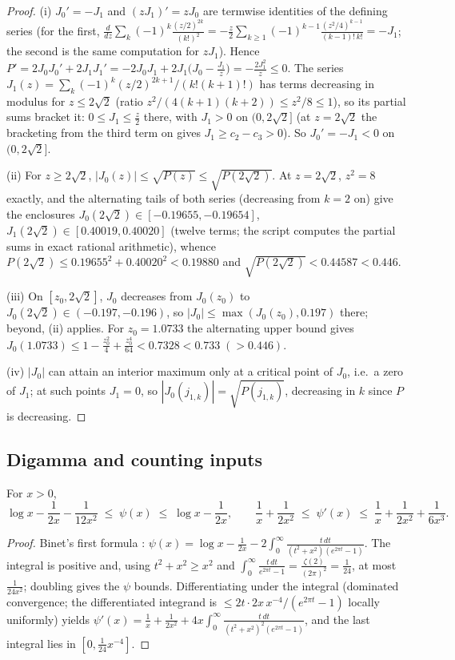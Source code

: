 \begin{proof}
(i) $J_0'=-J_1$ and $(zJ_1)'=zJ_0$ are termwise identities of the
defining series (for the first,
$\frac{d}{dz}\sum_k(-1)^k\frac{(z/2)^{2k}}{(k!)^2}
=-\frac z2\sum_{k\ge1}(-1)^{k-1}\frac{(z^2/4)^{k-1}}{(k-1)!\,k!}
=-J_1$; the second is the same computation for $zJ_1$). Hence
$P'=2J_0J_0'+2J_1J_1'=-2J_0J_1+2J_1\bigl(J_0-\tfrac{J_1}z\bigr)
=-\tfrac{2J_1^2}z\le0$. The series
$J_1(z)=\sum_k(-1)^k(z/2)^{2k+1}/(k!(k+1)!)$ has terms decreasing in
modulus for $z\le2\sqrt2$ (ratio $z^2/(4(k+1)(k+2))\le z^2/8\le1$),
so its partial sums bracket it: $0\le J_1\le\tfrac z2$ there, with
$J_1>0$ on $(0,2\sqrt2]$ (at $z=2\sqrt2$ the bracketing from the
third term on gives $J_1\ge c_2-c_3>0$). So $J_0'=-J_1<0$ on
$(0,2\sqrt2]$.

(ii) For $z\ge2\sqrt2$, $|J_0(z)|\le\sqrt{P(z)}\le\sqrt{P(2\sqrt2)}$.
At $z=2\sqrt2$, $z^2=8$ exactly, and the alternating tails of both
series (decreasing from $k=2$ on) give the enclosures
$J_0(2\sqrt2)\in[-0.19655,-0.19654]$,
$J_1(2\sqrt2)\in[0.40019,0.40020]$ (twelve terms; the script computes
the partial sums in exact rational arithmetic), whence
$P(2\sqrt2)\le0.19655^2+0.40020^2<0.19880$ and
$\sqrt{P(2\sqrt2)}<0.44587<0.446$.

(iii) On $[z_0,2\sqrt2]$, $J_0$ decreases from $J_0(z_0)$ to
$J_0(2\sqrt2)\in(-0.197,-0.196)$, so $|J_0|\le\max(J_0(z_0),0.197)$
there; beyond, (ii) applies. For $z_0=1.0733$ the alternating upper
bound gives $J_0(1.0733)\le1-\tfrac{z_0^2}4+\tfrac{z_0^4}{64}
<0.7328<0.733\;(>0.446)$.

(iv) $|J_0|$ can attain an interior maximum only at a critical point
of $J_0$, i.e.\ a zero of $J_1$; at such points $J_1=0$, so
$|J_0(j_{1,k})|=\sqrt{P(j_{1,k})}$, decreasing in $k$ since $P$ is
decreasing.
\end{proof}

\subsection*{Digamma and counting inputs}

\begin{lemma}\label{lem:binet}
For $x>0$,
\[
\log x-\frac1{2x}-\frac1{12x^2}\;\le\;\psi(x)\;\le\;\log x-\frac1{2x},
\qquad
\frac1x+\frac1{2x^2}\;\le\;\psi'(x)\;\le\;\frac1x+\frac1{2x^2}
+\frac1{6x^3}.
\]
\end{lemma}

\begin{proof}
Binet's first formula \cite[Ch.~XII]{WW27}:
$\psi(x)=\log x-\tfrac1{2x}-2\int_0^\infty
\frac{t\,dt}{(t^2+x^2)(e^{2\pi t}-1)}$. The integral is positive and,
using $t^2+x^2\ge x^2$ and
$\int_0^\infty\frac{t\,dt}{e^{2\pi t}-1}
=\frac{\zeta(2)}{(2\pi)^2}=\frac1{24}$, at most $\frac1{24x^2}$;
doubling gives the $\psi$ bounds. Differentiating under the integral
(dominated convergence; the differentiated integrand is
$\le2t\cdot2x\,x^{-4}/(e^{2\pi t}-1)$ locally uniformly) yields
$\psi'(x)=\frac1x+\frac1{2x^2}+4x\int_0^\infty
\frac{t\,dt}{(t^2+x^2)^2(e^{2\pi t}-1)}$, and the last integral lies
in $[0,\tfrac1{24}x^{-4}]$.
\end{proof}

